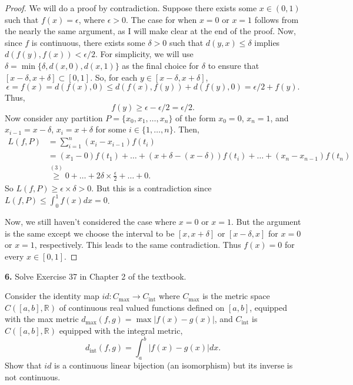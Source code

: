 \documentclass[12pt]{article}
\begin{document}
\begin{proof}
  We will do a proof by contradiction. Suppose there exists some $x \in (0,1)$
  such that $f(x) = \epsilon$, where $\epsilon > 0$. The case for when $x = 0$
  or $x = 1$ follows from the nearly the same argument, as I will make clear at
  the end of the proof. Now, since $f$ is continuous, there exists some $\delta
  > 0$ such that $d(y,x) \leq \delta$ implies $d(f(y), f(x)) < \epsilon / 2$.
  For simplicity, we will use $\delta = \min\{\delta, d(x,0), d(x,1)\}$ as the
  final choice for $\delta$ to ensure that $[x-\delta, x+\delta] \subset [0,1]$.
  So, for each $y \in [x - \delta, x+\delta]$,
  \[ \epsilon = f(x) = d(f(x),0) \leq d(f(x),f(y)) + d(f(y),0) = \epsilon/2 +
  f(y).\]
  Thus,
  \begin{equation}
    f(y) \geq \epsilon - \epsilon / 2 = \epsilon / 2.
  \end{equation}
  Now consider any partition $P = \{x_{0}, x_{1}, \dots, x_{n}\}$ of the form
  $x_{0} = 0$, $x_{n} = 1$, and $x_{i-1} = x - \delta$, $x_{i} = x + \delta$ for
  some $i \in \{1, \dots, n\}$. Then,
  \begin{align*}
    L(f,P) & = \sum_{i=1}^{n}(x_{i} - x_{i-1})f(t_{i}) \\
    & = (x_{1} - 0)f(t_{1}) + \dots + (x + \delta - (x - \delta))f(t_{i}) +
    \dots + (x_{n} - x_{n-1})f(t_{n}) \\
    & \stackrel{(3)}{\geq} 0 + \dots + 2\delta \times \frac{\epsilon}{2} + \dots
    + 0.
  \end{align*}
  So $L(f,P) \geq \epsilon \times \delta > 0$. But this is a contradiction since
  $L(f,P) \leq \int_{0}^{1}f(x)dx = 0$.

  Now, we still haven't considered the case where $x = 0$ or $x = 1$. But the argument is
  the same except we choose the interval to be $[x, x+\delta]$ or $[x-\delta,
  x]$ for $x=0$ or $x=1$, respectively. This leads to the same contradiction.
  Thus $f(x) = 0$ for every $x \in [0,1]$.
\end{proof}

{\bf 6.} Solve Exercise 37 in Chapter 2 of the textbook.

Consider the identity map $id:C_{\max}\rightarrow C_{\text{int}}$ where
$C_{\max}$ is the metric space $C([a,b], \mathbb{R})$ of continuous real valued
functions defined on $[a,b]$, equipped with the max metric $d_{\max}(f,g) =
\max|f(x)-g(x)|$, and $C_{\text{int}}$ is $C([a,b], \mathbb{R})$ equipped with
the integral metric,
\[ d_{\text{int}}(f,g) = \int_{a}^{b}|f(x) - g(x)|dx.\]
Show that $id$ is a continuous linear bijection (an isomorphism) but its inverse
is not continuous.
\end{document}
